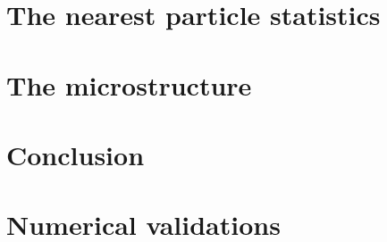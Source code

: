 \documentclass[11pt]{My_preprint}
\begin{document}
\section{The nearest particle statistics}


\section{The microstructure}
\label{sec:microstructure}



\section{Conclusion}


\appendix

\section{Numerical validations}
\label{ap:validation}





\end{document}
